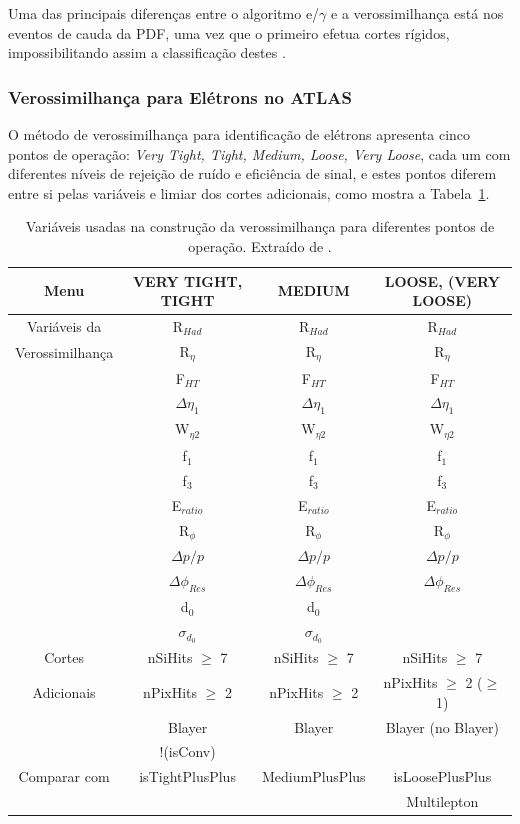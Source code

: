 Uma das principais diferenças entre o algoritmo e/$\gamma$ e a verossimilhança está nos eventos de cauda da PDF, uma vez que o primeiro efetua cortes rígidos, impossibilitando assim a classificação destes \cite{atlasdescription}.

\subsubsection{Verossimilhança para Elétrons no ATLAS}
	

O método de verossimilhança para identificação de elétrons apresenta cinco pontos de operação: \emph{Very Tight, Tight, Medium, Loose, Very Loose}, cada um com diferentes níveis de rejeição de ruído e eficiência de sinal, e estes pontos diferem entre si pelas variáveis e limiar dos cortes adicionais, como mostra a Tabela~\ref{tab:06}.

\begin{table}[h!]
  \centering
  \caption{Variáveis usadas na construção da verossimilhança para diferentes pontos de operação. Extraído de \cite{atlasdescription}.}\label{tab:06}
\begin{tabular}{c|c|c|c}

Menu	&	VERY TIGHT, TIGHT	&	MEDIUM	&	LOOSE, (VERY LOOSE)	\\ 	\hline
Variáveis da	&	R${_{Had}}$	&	R${_{Had}}$	&	R${_{Had}}$	\\ 	
Verossimilhança	&	R${_{\eta}}$	&	R${_{\eta}}$	&	R${_{\eta}}$	\\ 	
	&	F${_{HT}}$	&	F${_{HT}}$	&	F${_{HT}}$	\\ 	
	&	${\Delta\eta_{1}}$	&	${\Delta\eta_{1}}$	&	${\Delta\eta_{1}}$	\\ 	
	&	W${_{\eta2}}$	&	W${_{\eta2}}$	&	W${_{\eta2}}$	\\ 	
	&	f${_{1}}$	&	f${_{1}}$	&	f${_{1}}$	\\ 	
	&	f${_{3}}$	&	f${_{3}}$	&	f${_{3}}$	\\ 	
	&	E${_{ratio}}$	&	E${_{ratio}}$	&	E${_{ratio}}$	\\ 	
	&	R${_{\phi}}$	&	R${_{\phi}}$	&	R${_{\phi}}$	\\ 	
	&	$\Delta p/p$	&	$\Delta p/p$	&	$\Delta p/p$	\\ 	
	&	${\Delta\phi_{Res}}$	&	${\Delta\phi_{Res}}$	&	${\Delta\phi_{Res}}$	\\ 	
	&	d${_{0}}$	&	d${_{0}}$	&		\\ 	
	&	${\sigma _{{d_0}}}$	&	${\sigma _{{d_0}}}$	&		\\ 	\hline
Cortes	&	nSiHits $\ge$  7	&	nSiHits $\ge$  7	&	nSiHits $\ge$  7	\\ 	
Adicionais	&	nPixHits $\ge$ 2	&	nPixHits $\ge$ 2	&	nPixHits $\ge$ 2 ($\ge$ 1)	\\ 	
	&	Blayer	&	Blayer	&	Blayer (no Blayer)	\\ 	
	&	!(isConv)	&		&		\\ 	\hline
Comparar com	&	isTightPlusPlus	&	MediumPlusPlus	&	isLoosePlusPlus	\\ 	
	&		&		&	Multilepton	\\ 	

\end{tabular}
\end{table}
